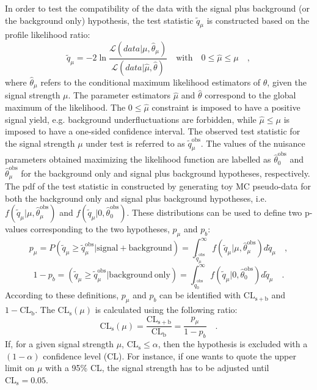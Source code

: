 In order to test the compatibility of the data with the signal plus background (or the background only) hypothesis, the test statistic $\tilde{q}_\mu$ is constructed based on the profile likelihood ratio:
\begin{equation}
\tilde{q}_\mu = -2 \ln{\frac{\mathcal{L}(data|\mu,\hat{\theta}_\mu)}{\mathcal{L}(data|\hat{\mu},\hat{\theta})	}}  \quad \mathrm{with} \quad 0 \leq \hat{\mu} \leq \mu \quad ,
\end{equation}
where $\hat{\theta}_\mu$ refers to the conditional maximum likelihood estimators of $\theta$, given the signal strength $\mu$. The parameter estimators $\hat{\mu}$ and $\hat{\theta}$ correspond to the global maximum of the likelihood. The $0 \leq \hat{\mu}$ constraint is imposed to have a positive signal yield, e.g. background underfluctuations are forbidden, while $\hat{\mu} \leq \mu$ is imposed to have a one-sided confidence interval. The observed test statistic for the signal strength $\mu$ under test is referred to as $\tilde{q}_\mu^\mathrm{obs}$. The values of the nuisance parameters obtained maximizing the likelihood function are labelled as $\hat{\theta}_0^\mathrm{obs}$ and $\hat{\theta}_\mu^\mathrm{obs}$ for the background only and signal plus background hypotheses, respectively. The pdf of the test statistic in constructed by generating toy MC pseudo-data for both the background only and signal plus background hypotheses, i.e. $f(\tilde{q}_\mu|\mu,\hat{\theta}_\mu^\mathrm{obs})$ and $f(\tilde{q}_\mu|0,\hat{\theta}_0^\mathrm{obs})$. These distributions can be used to define two p-values corresponding to the two hypotheses, $p_\mu$ and $p_b$:
\begin{equation}
p_\mu = P(\tilde{q}_\mu \geq \tilde{q}_\mu^\mathrm{obs}|\mathrm{signal+background}) = \int_{\tilde{q}_\mu^\mathrm{obs}}^{\infty} f(\tilde{q}_\mu|\mu,\hat{\theta}_\mu^\mathrm{obs}) d\tilde{q}_\mu \quad ,
\end{equation}
\begin{equation}
1 - p_b = (\tilde{q}_\mu \geq \tilde{q}_\mu^\mathrm{obs}|\mathrm{background~only}) = \int_{\tilde{q}_0^\mathrm{obs}}^{\infty} f(\tilde{q}_\mu|0,\hat{\theta}_0^\mathrm{obs}) d\tilde{q}_\mu \quad .
\end{equation}
According to these definitions, $p_\mu$ and $p_b$ can be identified with $\mathrm{CL_{s+b}}$ and $1-\mathrm{CL_b}$.
The $\mathrm{CL_s}(\mu)$ is calculated using the following ratio:
\begin{equation}
\mathrm{CL_s}(\mu) = \frac{\mathrm{CL_{s+b}}}{\mathrm{CL_b}} = \frac{p_\mu}{1-p_b} \quad .
\end{equation}
If, for a given signal strength $\mu$, $\mathrm{CL_s} \leq \alpha$, then the hypothesis is excluded with a $(1-\alpha)$ confidence level (CL). For instance, if one wants to quote the upper limit on $\mu$ with a 95\% CL, the signal strength has to be adjusted until $\mathrm{CL_s} = 0.05$.

